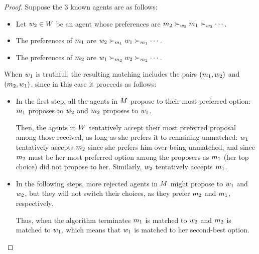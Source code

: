\begin{lemmarep}
\label{lem:da-truncation}
\end{lemmarep}
 
\begin{proof}
Suppose the $3$ known agents are as follows:
\begin{itemize}
\item Let $w_2 \in W$ be an agent whose preferences are $m_2 \succ_{w_2} m_1 \succ_{w_2} \cdots $.

\item The preferences of $m_1$ are $w_2 \succ_{m_1} w_1 \succ_{m_1} \cdots$.

\item The preferences of $m_2$ are $w_1 \succ_{m_2} w_2 \succ_{m_2} \cdots$.
\end{itemize}
When $w_1$ is truthful, the resulting matching includes the pairs $(m_1, w_2)$ and $(m_2, w_1)$, since in this case it proceeds as follows:
\begin{itemize}
\item In the first step, all the agents in $M$ propose to their most preferred option: $m_1$ proposes to $w_2$ and $m_2$ proposes to $w_1$.

Then, the agents in $W$ tentatively accept their most preferred proposal among those received, as long as she prefers it to remaining unmatched: 
$w_1$ tentatively accepts $m_2$ since she prefers him over being unmatched, and since $m_2$ must be her most preferred option among the proposers as $m_1$ (her top choice) did not propose to her.
Similarly, $w_2$ tentatively accepts $m_1$.

\item In the following steps, more rejected agents in $M$ might propose to $w_1$ and $w_2$, but they will not switch their choices, as they prefer $m_2$ and $m_1$, respectively. 

Thus, when the algorithm terminates $m_1$ is matched to $w_2$ and $m_2$ is matched to $w_1$, which means that $w_1$ is matched to her second-best option.
\end{itemize}



\end{proof}
